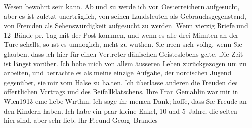 \begin{ledgroupsized}[t]{13cm}
                    Wesen bewohnt sein kann.\pend
           \pstart
           Ab und zu werde ich von Oesterreichern
                    aufgesucht, aber es ist zuletzt unerträglich, von seinen Landsleuten als
                    Gebrauchsgegenstand, {\pb}von
                    Fremden als Sehenswürdigkeit aufgesucht zu werden. Wenn vierzig Briefe und
                    12 Bände pr. Tag  mit der Post \introOben{}kommen,\introOben{} und wenn es alle drei Minuten an der Türe
                    schellt, so ist es unmöglich, nicht zu wüthen.\pend
           \pstart
           Sie irren sich völlig, wenn Sie glauben, dass ich hier für einen Vertreter dänischen Geisteslebens gelte. Die Zeit ist
                    längst vorüber. Ich habe mich von allem äusseren Leben zurückgezogen um zu
                    arbeiten, und betrachte es als meine einzige Aufgabe, der nordischen Jugend gegenüber, sie mir vom Halse zu halten.
                    Ich überlasse anderen die Freuden des öffentlichen Vortrags und des
                    Beifallklatschens.\pend
           \pstart
           Ihre Frau Gemahlin war mir
                    in Wien1913 eine liebe Wirthin. Ich sage ihr meinen Dank; hoffe, dass Sie
                    Freude an den Kindern haben. Ich habe ein paar kleine Enkel, 10 und 5 Jahre, die selten hier sind, aber sehr lieb.\pend
           \pstart Ihr Freund \spacefill\mbox{Georg Brandes}\pend{}          \endnumbering{}\end{ledgroupsized}  \newcommand{\dateiname}{L02303}\newcommand{\titel}{Georg Brandes an Arthur Schnitzler, 18. 9. 1918}\newcommand{\editorInnen}{Martin Anton Müller und Gerd-Hermann Susen}
            \footnotesize
\begin{ledgroupsized}[t]{11.5cm}
\end{ledgroupsized}
         
      